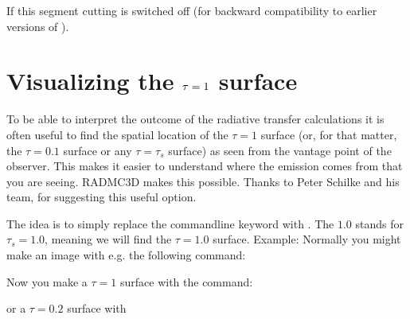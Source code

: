 \documentclass[letterpaper,10pt,english]{sphinxmanual}
\begin{document}
If  this segment cutting is switched off (for
backward compatibility to earlier versions of ).


\section{Visualizing the \protect\(\tau=1\protect\) surface}
\label{\detokenize{imagesspectra:visualizing-the-tau-1-surface}}\label{\detokenize{imagesspectra:sec-tausurf}}
To be able to interpret the outcome of the radiative transfer calculations it is
often useful to find the spatial location of the \(\tau=1\) surface (or, for
that matter, the \(\tau=0.1\) surface or any \(\tau=\tau_s\) surface) as
seen from the vantage point of the observer. This makes it easier to understand
where the emission comes from that you are seeing. RADMC\sphinxhyphen{}3D makes this
possible. Thanks to Peter Schilke and his team, for suggesting this useful
option.

The idea is to simply replace the command\sphinxhyphen{}line keyword  with . The \(1.0\) stands for \(\tau_s=1.0\), meaning we will find the
\(\tau=1.0\) surface. Example: Normally you might make an image with
e.g. the following command:

\begin{sphinxVerbatim}[commandchars=\\\{\}]
       
\end{sphinxVerbatim}

Now you make a \(\tau=1\) surface with the command:

\begin{sphinxVerbatim}[commandchars=\\\{\}]
        
\end{sphinxVerbatim}

or a \(\tau=0.2\) surface with

\begin{sphinxVerbatim}[commandchars=\\\{\}]
        
\end{sphinxVerbatim}
\end{document}
